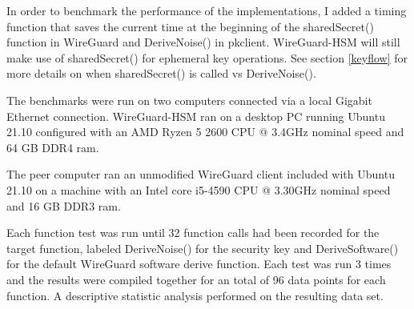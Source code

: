 \documentclass [11pt, proquest] {uwthesis}[2020/02/24]
\begin{document}
In order to benchmark the performance of the implementations, I added a timing function that saves the current time at the beginning of the sharedSecret() function in WireGuard and DeriveNoise() in pkclient. WireGuard-HSM will still make use of sharedSecret() for ephemeral key operations.
See section \ref{keyflow} for more details on when sharedSecret() is called vs DeriveNoise().

The benchmarks were run on two computers connected via a local Gigabit Ethernet connection. 
WireGuard-HSM ran on a desktop PC running Ubuntu 21.10 configured with an AMD Ryzen 5 2600 CPU @ 3.4GHz nominal speed and 64 GB DDR4 ram. 

The peer computer ran an unmodified WireGuard client included with Ubuntu 21.10 on a machine with an Intel core i5-4590 CPU @ 3.30GHz nominal speed and 16 GB DDR3 ram.  

Each function test was run until 32 function calls had been recorded for the target function, labeled DeriveNoise() for the security key and DeriveSoftware() for the default WireGuard software derive function.
Each test was run 3 times and the results were compiled together for an total of 96 data points for each function. A descriptive statistic analysis performed on the resulting data set.
\end{document}
